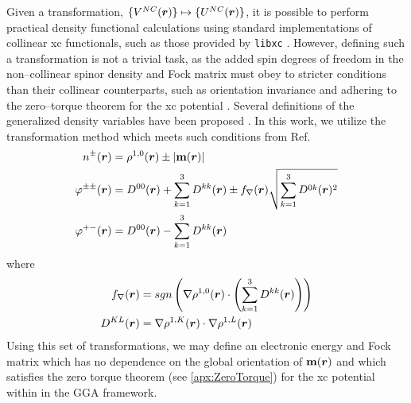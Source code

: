 Given a transformation, $\{ V^{NC}(\boldsymbol{r}) \} \mapsto \{U^{NC}(\boldsymbol{r})\}$, it is possible to perform practical
density functional calculations using standard implementations of collinear xc functionals, such
as those provided by \texttt{libxc} \cite{Burnus12_2272,Marques18_1}. However, defining such a transformation is not 
a trivial task, as the added spin degrees of freedom in the non--collinear spinor density and
Fock matrix must obey to stricter conditions than their collinear counterparts, such as orientation
invariance and adhering to the zero--torque theorem for the xc potential \cite{Gyorffy01_206403}.
Several definitions of the generalized density variables have been proposed \cite{Wullen02_779,Ullrich05_073102,Frisch07_125119,Frisch12_2193,Scuseria13_035117}.
In this work, we utilize the transformation method which meets such conditions from Ref.\cite{Li17_2591} 
\begin{subequations}
  \label{eq:NCtrans}
  \begin{align}    
    n^\pm(\boldsymbol{r})        & = \rho^{1,0}(\boldsymbol{r}) \pm \vert\mathbf{m}(\boldsymbol{r})\vert\\
     \varphi^{\pm\pm}(\boldsymbol{r}) & = D^{00}(\boldsymbol{r})   + \sum_{k=1}^3 D^{kk} (\boldsymbol{r}) 
                           \pm f_{\nabla}(\boldsymbol{r})\sqrt{ \sum_{k=1}^3 D^{0k}(\boldsymbol{r})^2} \\
     \varphi^{+-}(\boldsymbol{r})      & = D^{00} (\boldsymbol{r})
                           - \sum_{k=1}^3 D^{kk} (\boldsymbol{r})
  \end{align}
\end{subequations}
where
\begin{align}  
  f_{\nabla}(\boldsymbol{r}) & = sgn\left(\nabla\rho^{1,0} (\boldsymbol{r}) \cdot \left(\sum_{k=1}^3 D^{kk}(\boldsymbol{r}) \right)\right) \\
  D^{KL} (\boldsymbol{r})      &  = \nabla\rho^{1,K} (\boldsymbol{r}) \cdot  \nabla \rho^{1,L} (\boldsymbol{r})  
\end{align} 
Using this set of transformations, we may define an electronic energy and Fock matrix which has no dependence
on the global orientation of $\mathbf{m}(\boldsymbol{r})$ and which satisfies the zero torque theorem (see \cref{apx:ZeroTorque}) for
the xc potential within in the GGA framework.

